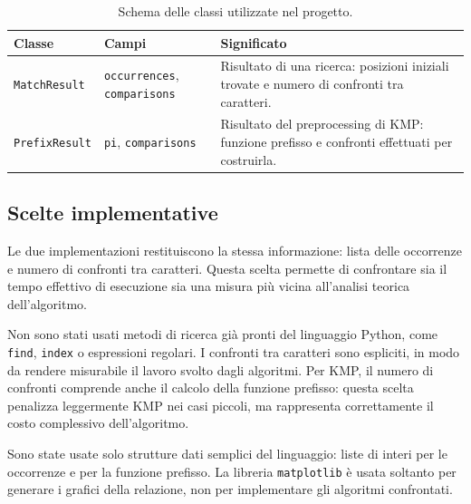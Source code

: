 \documentclass{article}
\begin{document}
\begin{table}[H]
\centering
\small
\begin{tabular}{p{}p{}p{}}
\toprule
Classe & Campi & Significato \\
\midrule
\texttt{MatchResult} & \texttt{occurrences}, \texttt{comparisons} & Risultato di una ricerca: posizioni iniziali trovate e numero di confronti tra caratteri. \\
\texttt{PrefixResult} & \texttt{pi}, \texttt{comparisons} & Risultato del preprocessing di KMP: funzione prefisso e confronti effettuati per costruirla. \\
\bottomrule
\end{tabular}
\caption{Schema delle classi utilizzate nel progetto.}
\label{tab:classi}
\end{table}

\subsection{Scelte implementative}
Le due implementazioni restituiscono la stessa informazione: lista delle occorrenze e numero di confronti tra caratteri. Questa scelta permette di confrontare sia il tempo effettivo di esecuzione sia una misura più vicina all'analisi teorica dell'algoritmo.

Non sono stati usati metodi di ricerca già pronti del linguaggio Python, come \texttt{find}, \texttt{index} o espressioni regolari. I confronti tra caratteri sono espliciti, in modo da rendere misurabile il lavoro svolto dagli algoritmi. Per KMP, il numero di confronti comprende anche il calcolo della funzione prefisso: questa scelta penalizza leggermente KMP nei casi piccoli, ma rappresenta correttamente il costo complessivo dell'algoritmo.

Sono state usate solo strutture dati semplici del linguaggio: liste di interi per le occorrenze e per la funzione prefisso. La libreria \texttt{matplotlib} è usata soltanto per generare i grafici della relazione, non per implementare gli algoritmi confrontati.
\end{document}
